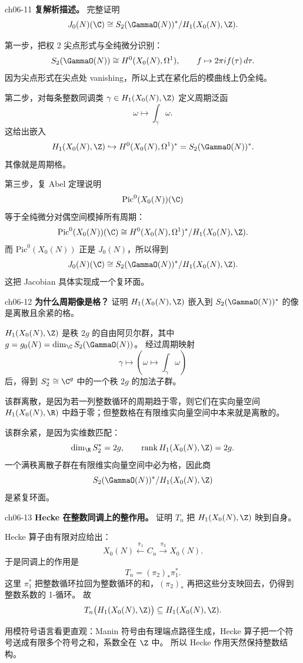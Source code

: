\begin{problem}{ch06-11}
\textbf{复解析描述。}
完整证明
\[
J_0(N)(\C)\cong S_2(\GammaO(N))^*/H_1(X_0(N),\Z).
\]
\end{problem}
\begin{solution}
第一步，把权 $2$ 尖点形式与全纯微分识别：
\[
S_2(\GammaO(N))\cong H^0(X_0(N),\Omega^1),
\qquad
f\mapsto 2\pi i f(\tau)\,d\tau.
\]
因为尖点形式在尖点处 vanishing，所以上式在紧化后的模曲线上仍全纯。

第二步，对每条整数同调类 $\gamma\in H_1(X_0(N),\Z)$ 定义周期泛函
\[
\omega\longmapsto \int_\gamma \omega.
\]
这给出嵌入
\[
H_1(X_0(N),\Z)\hookrightarrow H^0(X_0(N),\Omega^1)^*=S_2(\GammaO(N))^*.
\]
其像就是周期格。

第三步，复 Abel 定理说明
\[
\mathrm{Pic}^0(X_0(N))(\C)
\]
等于全纯微分对偶空间模掉所有周期：
\[
\mathrm{Pic}^0(X_0(N))(\C)
\cong H^0(X_0(N),\Omega^1)^*/H_1(X_0(N),\Z).
\]
而 $\mathrm{Pic}^0(X_0(N))$ 正是 $J_0(N)$，所以得到
\[
J_0(N)(\C)\cong S_2(\GammaO(N))^*/H_1(X_0(N),\Z).
\]
这把 Jacobian 具体实现成一个复环面。
\end{solution}

\begin{problem}{ch06-12}
\textbf{为什么周期像是格？}
证明 $H_1(X_0(N),\Z)$ 嵌入到 $S_2(\GammaO(N))^*$ 的像是离散且余紧的格。
\end{problem}
\begin{solution}
$H_1(X_0(N),\Z)$ 是秩 $2g$ 的自由阿贝尔群，其中 $g=g_0(N)=\dim_\C S_2(\GammaO(N))$。
经过周期映射
\[
\gamma\mapsto \left(\omega\mapsto \int_\gamma \omega\right)
\]
后，得到 $S_2^*\cong \C^g$ 中的一个秩 $2g$ 的加法子群。

该群离散，是因为若一列整数循环的周期趋于零，则它们在实向量空间
$H_1(X_0(N),\R)$ 中趋于零；但整数格在有限维实向量空间中本来就是离散的。

该群余紧，是因为实维数匹配：
\[
\dim_\R S_2^*=2g,
\qquad \mathrm{rank}\,H_1(X_0(N),\Z)=2g.
\]
一个满秩离散子群在有限维实向量空间中必为格，因此商
\[
S_2(\GammaO(N))^*/H_1(X_0(N),\Z)
\]
是紧复环面。
\end{solution}

\begin{problem}{ch06-13}
\textbf{Hecke 在整数同调上的整作用。}
证明 $T_n$ 把 $H_1(X_0(N),\Z)$ 映到自身。
\end{problem}
\begin{solution}
Hecke 算子由有限对应给出：
\[
X_0(N) \xleftarrow{\pi_1} C_n \xrightarrow{\pi_2} X_0(N).
\]
于是同调上的作用是
\[
T_n=(\pi_2)_*\pi_1^*.
\]
这里 $\pi_1^*$ 把整数循环拉回为整数循环的和，$(\pi_2)_*$ 再把这些分支映回去，仍得到整数系数的 1-循环。
故
\[
T_n\bigl(H_1(X_0(N),\Z)\bigr)\subseteq H_1(X_0(N),\Z).
\]

用模符号语言看更直观：Manin 符号由有理端点路径生成，Hecke 算子把一个符号送成有限多个符号之和，系数全在 $\Z$ 中。
所以 Hecke 作用天然保持整数结构。
\end{solution}

